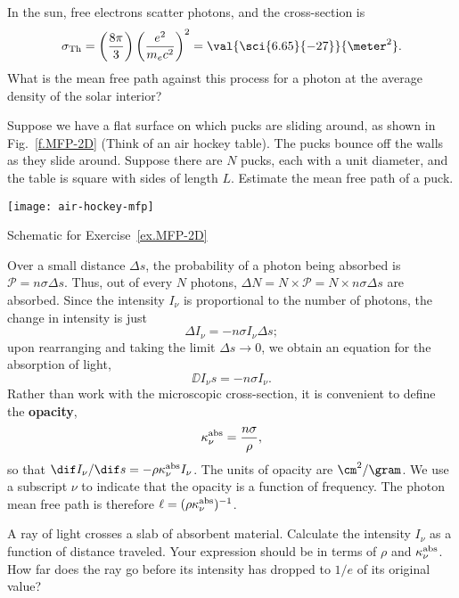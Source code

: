 \begin{exercisebox}\label{ex.MFP}
    In the sun, free electrons scatter photons, and the cross-section is
    \[
    \sigma_{\mathrm{Th}} = \left(\frac{8\pi}{3}\right)\left(\frac{e^2}{m_e c^2}\right)^2 = \val{\sci{6.65}{-27}}{\meter^2}.
    \]
    What is the mean free path against this process for a photon at the average density of the solar interior?
\end{exercisebox}

\begin{exercisebox}\label{ex.MFP-2D}
    Suppose we have a flat surface on which pucks are sliding around, as shown in Fig.~\ref{f.MFP-2D} (Think of an air hockey table). The pucks bounce off the walls as they slide around.  Suppose there are $N$ pucks, each with a unit diameter, and the table is square with sides of length $L$.  Estimate the mean free path of a puck.
\end{exercisebox}

\begin{marginfigure}[-5\baselineskip]
    \texttt{[image: air-hockey-mfp]}
    \caption[Mean free path of a hockey puck]{\label{f.MFP-2D}Schematic for Exercise~\ref{ex.MFP-2D}}
\end{marginfigure}

 Over a small distance $\Delta s$, the probability of a photon being absorbed is $\mathcal{P} = n\sigma\Delta s$. Thus, out of every $N$ photons, $\Delta N = N \times\mathcal{P} = N\times n\sigma\Delta s$ are absorbed. Since the intensity $I_{\nu}$ is proportional to the number of photons, the change in intensity is just
\[ \Delta I_{\nu} = -n\sigma I_{\nu}\Delta s; \]
upon rearranging and taking the limit $\Delta s\to0$, we obtain an equation for the absorption of light,
\begin{equation}\label{e.absorption-microscopic}
\DD{I_{\nu}}{s} = -n\sigma I_{\nu}.
\end{equation}
Rather than work with the microscopic cross-section, it is convenient to define the \textbf{opacity},
\[
	\kappa_\nu^{\mathrm{abs}} = \frac{n\sigma}{\rho},
\]
so that $\dif I_{\nu}/\dif s = -\rho\kapabs I_{\nu}$. The units of opacity are $\cm^{2}/\gram$. We use a subscript $\nu$ to indicate that the opacity is a function of frequency. The photon mean free path is therefore $\ell = (\rho\kappa_\nu^{\mathrm{abs}})^{-1}$.

\begin{exercisebox}
A ray of light crosses a slab of absorbent material. Calculate the intensity $I_{\nu}$ as a function of distance traveled. Your expression should be in terms of $\rho$ and $\kappa_\nu^{\mathrm{abs}}$. How far does the ray go before its intensity has dropped to $1/e$ of its original value?
\end{exercisebox}

